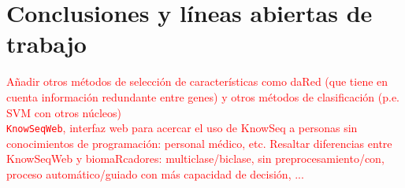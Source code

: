 \chapter{Conclusiones y líneas abiertas de trabajo}

\textcolor{red}{Añadir otros métodos de selección de características como daRed (que tiene en cuenta información redundante entre genes) y otros métodos de clasificación (p.e. SVM con otros núcleos)}\\

\textcolor{red}{\texttt{KnowSeqWeb}, interfaz web para acercar el uso de KnowSeq a personas sin conocimientos de programación: personal médico, etc. Resaltar diferencias entre KnowSeqWeb y biomaRcadores: multiclase/biclase, sin preprocesamiento/con, proceso automático/guiado con más capacidad de decisión, ...}\\



